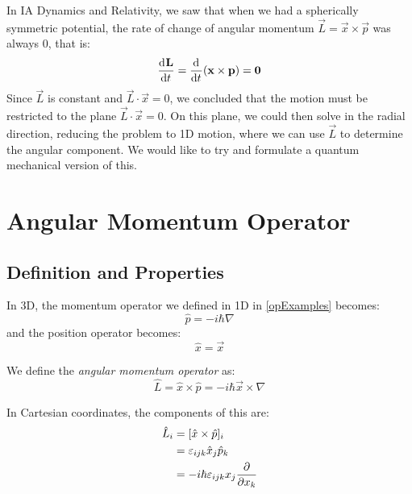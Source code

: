 \documentclass[../main.tex]{subfiles}
\begin{document}
In IA Dynamics and Relativity, we saw that when we had a spherically symmetric potential, the rate of change of angular momentum $\vec{L} = \vec{x} \times \vec{p}$ was always 0, that is:
\[
  \deriv{\vec{L}}{t} = \deriv{}{t}(\vec{x} \times \vec{p}) = \vec{0}
\]
Since $\vec{L}$ is constant and $\vec{L} \cdot \vec{x} = 0$, we concluded that the motion must be restricted to the plane $\vec{L} \cdot \vec{x} = 0$.
On this plane, we could then solve in the radial direction, reducing the problem to 1D motion, where we can use $\vec{L}$ to determine the angular component.
We would like to try and formulate a quantum mechanical version of this.
\section{Angular Momentum Operator}
\subsection{Definition and Properties}
In 3D, the momentum operator we defined in 1D in \cref{opExamples} becomes:
\[
  \hat{p} = -i\hbar \nabla
\]
and the position operator becomes:
\[
  \hat{x} = \vec{x}
\]
\begin{definition}
  We define the \textit{angular momentum operator} as:
  \[
    \hat{L} = \hat{x} \times \hat{p} = -i\hbar\vec{x} \times \nabla
  \]
\end{definition}
In Cartesian coordinates, the components of this are:
\begin{align*}
  \hat{L}_i &= [\hat{x} \times \hat{p}]_i \\
            &= \levi_{i j k} \hat{x}_j \hat{p}_k \\
            &= -i\hbar \levi_{i j k} x_j \pderiv{}{x_k}
\end{align*}
\end{document}
